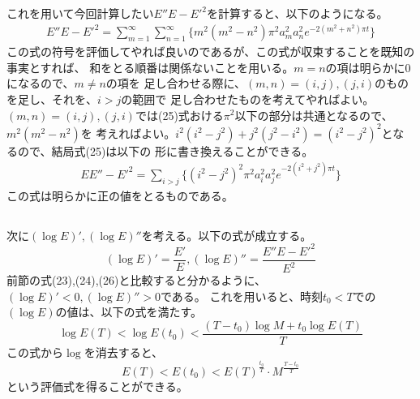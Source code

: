 \documentclass{jarticle}
\begin{document}
これを用いて今回計算したい$E''E-E'^2$を計算すると、以下のようになる。
\begin{eqnarray}
E''E-E'^2 = \sum^\infty_{m=1}\sum^\infty_{n=1} \{ m^2(m^2-n^2)\pi^2a_m^2a_n^2
e^{-2(m^2+n^2)\pi t}\}
\end{eqnarray}
この式の符号を評価してやれば良いのであるが、この式が収束することを既知の事実とすれば、
和をとる順番は関係ないことを用いる。$m=n$の項は明らかに0になるので、$m\neq n$の項を
足し合わせる際に、$(m,n) = (i,j),(j,i)$のものを足し、それを、$i> j$の範囲で
足し合わせたものを考えてやればよい。
\\
$(m,n)=(i,j),(j,i)$では(25)式おける$\pi^2$以下の部分は共通となるので、$m^2(m^2-n^2)$を
考えればよい。$i^2(i^2-j^2)+j^2(j^2-i^2) = (i^2-j^2)^2$となるので、結局式(25)は以下の
形に書き換えることができる。
\begin{eqnarray}
EE''-E'^2 = \sum_{i>j} \{ (i^2-j^2)^2 \pi^2 a_i^2a_j^2e^{-2(i^2+j^2)\pi t} \}
\end{eqnarray}
この式は明らかに正の値をとるものである。

\subsection{}
次に$(\log E)',(\log E )''$を考える。以下の式が成立する。
\begin{equation}
(\log E)' = \frac{E'}{E},(\log E)'' = \frac{E''E-E'^2}{E^2}
\end{equation}
前節の式(23),(24),(26)と比較すると分かるように、$(\log E)'<0,(\log E)''>0$である。
これを用いると、時刻$t_0<T$での$(\log E)$の値は、以下の式を満たす。
\begin{equation}
\log E(T) < \log E(t_0) < \frac{(T-t_0)\log M + t_0 \log E(T)}{T}
\end{equation}
この式から$\log$を消去すると、
\begin{equation}
E(T)<E(t_0)<E(T)^{\frac{t_0}{T}}\cdot M^{\frac{T-t_0}{T}}
\end{equation}
という評価式を得ることができる。


\section{}
\end{document}
